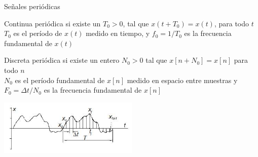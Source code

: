  \begin{frame}{Señales periódicas}
    \begin{block}{Continua periódica}
       si existe un $T_0>0$, tal que $x(t+T_0)=x(t)$, para todo $t$\\
       $T_0$ es el período de $x(t)$ medido en tiempo, y $f_0=1/T_0$ es la frecuencia fundamental de $x(t)$
    \end{block}
    \begin{block}{Discreta periódica}
       si existe un entero $N_0>0$ tal que $x[n+N_0]=x[n]$ para
       todo $n$ \\
       $N_0$ es el período fundamental de $x[n]$ medido en espacio entre muestras
       y  $F_0=\Delta t/N_0$ es la frecuencia fundamental de $x[n]$
    \end{block}
    \center\includegraphics[width=0.5\textwidth]{1_clase/periodica}
    \vfill
 \end{frame}
